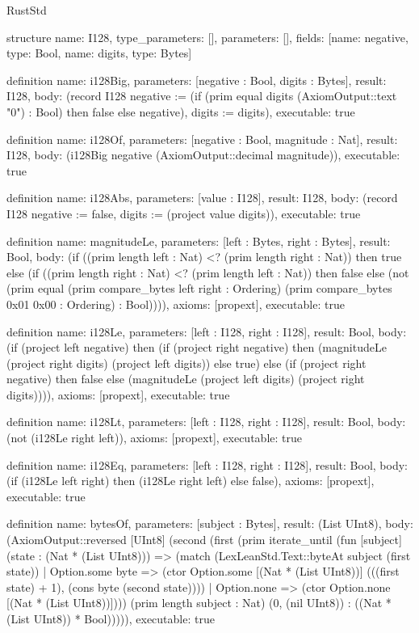 \begin{lexlean}{RustStd}
\begin{semanticmodule}
structure{
  name: I128,
  type_parameters: [],
  parameters: [],
  fields: [{name: negative, type: Bool}, {name: digits, type: Bytes}]
}

definition{
  name: i128Big,
  parameters: [negative : Bool, digits : Bytes],
  result: I128,
  body: (record I128 {negative := (if (prim equal digits (AxiomOutput::text "0") : Bool) then false else negative), digits := digits}),
  executable: true
}

definition{
  name: i128Of,
  parameters: [negative : Bool, magnitude : Nat],
  result: I128,
  body: (i128Big negative (AxiomOutput::decimal magnitude)),
  executable: true
}

definition{
  name: i128Abs,
  parameters: [value : I128],
  result: I128,
  body: (record I128 {negative := false, digits := (project value digits)}),
  executable: true
}

definition{
  name: magnitudeLe,
  parameters: [left : Bytes, right : Bytes],
  result: Bool,
  body: (if ((prim length left : Nat) <? (prim length right : Nat)) then true else (if ((prim length right : Nat) <? (prim length left : Nat)) then false else (not (prim equal (prim compare_bytes left right : Ordering) (prim compare_bytes 0x01 0x00 : Ordering) : Bool)))),
  axioms: [propext],
  executable: true
}

definition{
  name: i128Le,
  parameters: [left : I128, right : I128],
  result: Bool,
  body: (if (project left negative) then (if (project right negative) then (magnitudeLe (project right digits) (project left digits)) else true) else (if (project right negative) then false else (magnitudeLe (project left digits) (project right digits)))),
  axioms: [propext],
  executable: true
}

definition{
  name: i128Lt,
  parameters: [left : I128, right : I128],
  result: Bool,
  body: (not (i128Le right left)),
  axioms: [propext],
  executable: true
}

definition{
  name: i128Eq,
  parameters: [left : I128, right : I128],
  result: Bool,
  body: (if (i128Le left right) then (i128Le right left) else false),
  axioms: [propext],
  executable: true
}

definition{
  name: bytesOf,
  parameters: [subject : Bytes],
  result: (List UInt8),
  body: (AxiomOutput::reversed [UInt8] (second (first (prim iterate_until (fun [subject] (state : (Nat * (List UInt8))) => (match (LexLeanStd.Text::byteAt subject (first state))
    | Option.some byte => (ctor Option.some [(Nat * (List UInt8))] (((first state) + 1), (cons byte (second state))))
    | Option.none => (ctor Option.none [(Nat * (List UInt8))]))) (prim length subject : Nat) (0, (nil UInt8)) : ((Nat * (List UInt8)) * Bool))))),
  executable: true
}


\end{semanticmodule}
\end{lexlean}
